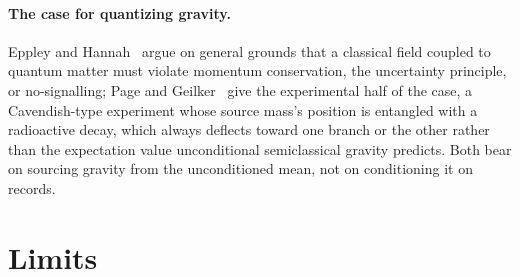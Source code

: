 \documentclass[aps,pra,reprint,amsmath,amssymb,superscriptaddress]{revtex4-2}
\begin{document}
\paragraph{The case for quantizing gravity.} Eppley and
Hannah~\cite{EppleyHannah1977} argue on general grounds that a classical
field coupled to quantum matter must violate momentum conservation, the
uncertainty principle, or no-signalling; Page and Geilker~\cite{PageGeilker1981}
give the experimental half of the case, a Cavendish-type experiment whose
source mass's position is entangled with a radioactive decay, which always
deflects toward one branch or the other rather than the expectation value
unconditional semiclassical gravity predicts. Both bear on sourcing gravity
from the unconditioned mean, not on conditioning it on records.

\section{Limits}
\label{sec:limits}
\end{document}
